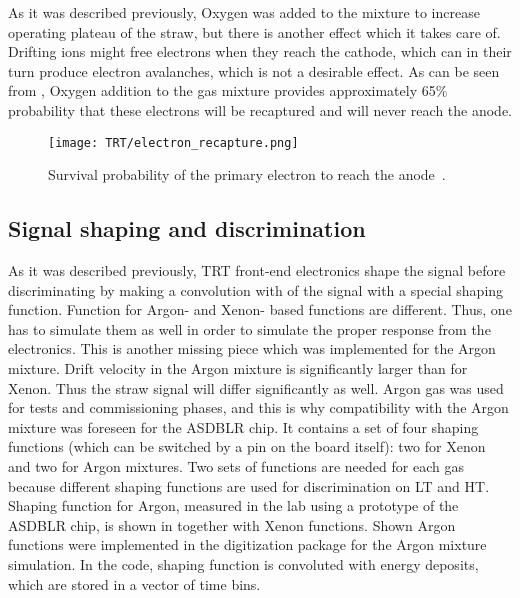 As it was described previously, Oxygen was added to the mixture to increase operating plateau of the straw, but there is another effect which it takes care of.
Drifting ions might free electrons when they reach the cathode, which can in their turn produce electron avalanches, which is not a desirable effect.
As can be seen from , Oxygen addition to the gas mixture provides approximately 65$\%$ probability that these electrons will be recaptured 
and will never reach the anode. 

\begin{figure}
\centering
\texttt{[image: TRT/electron\_recapture.png]}
\caption{ 
 Survival probability of the primary electron to reach the anode~\cite{esben_thesis}.
}
\label{fig:electron_recapture}
\end{figure}

\subsection{Signal shaping and discrimination}


As it was described previously, 
TRT front-end electronics shape the signal before discriminating by making a convolution with of the signal with a special shaping function. Function for Argon- and Xenon- based functions are different. Thus, one has to simulate them as well in order to simulate the proper response from the electronics. 
This is another missing piece which was implemented for the Argon mixture. 
Drift velocity in the Argon mixture is significantly larger than for Xenon. Thus the straw signal will differ significantly as well.
Argon gas was used for tests and commissioning phases, and this is why compatibility with the Argon mixture was foreseen for the ASDBLR chip. It contains a set of four shaping functions (which can be switched
by a pin on the board itself): two for Xenon and two for Argon mixtures. Two sets of functions are needed for each gas because different shaping functions are used for discrimination on LT and HT. Shaping function for Argon, measured in the lab using a prototype of the ASDBLR chip, is shown in  together with Xenon functions. Shown Argon functions were implemented in the digitization package for the Argon mixture simulation. In the code, shaping function is convoluted with energy deposits, which are stored in a vector of time bins.

